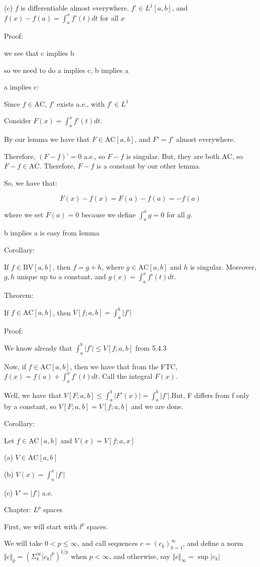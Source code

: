 \documentclass[10pt]{article}
\newcommand{\bv}{{\text{BV}}}
\newcommand{\ac}{\text{AC}}
\begin{document}
(c) $f$ is differentiable almost everywhere, $f’ \in L^1[a,b]$, and $f(x) - f(a)  = \int_a^x f’(t) dt$ for all $x$

Proof:

we see that c implies b

so we need to do a implies c, b implies a

a implies c:

Since $f \in \ac$, $f’$ exists a.e., with $f’ \in L^1$

Consider $F(x) = \int_a^x f’(t) dt$.

By our lemma we have that $F \in \ac[a,b]$, and $F’ = f’$ almost everywhere.

Therefore, $(F - f)’ = 0$ a.e., so $F - f$ is singular. But, they are both $\ac$, so $F - f \in \ac$. Therefore, $F - f$ is a constant by our other lemma.

So, we have that:

$$F(x) - f(x) = F(a) - f(a) = - f(a)$$

where we set $F(a) = 0$ because we define $\int_a^a g = 0$ for all $g$.

b implies a is easy from lemma

Corollary:

If $f \in \bv[a,b]$, then $f = g + h$, where $g \in \ac[a,b]$ and $h$ is singular. Moreover, $g,h$ unique up to a constant, and $g(x) = \int_a^x f’(t) dt$.

Theorem:

If $f \in \ac[a,b]$, then $V[f;a,b] = \int_a^b |f’|$

Proof:

We know already that $\int_a^b |f’| \leq V[f;a,b]$ from 5.4.3

Now, if $f \in \ac[a,b]$, then we have that from the FTC, $f(x) = f(a) + \int_a^x f’(t) dt$. Call the integral $F(x)$.

Well, we have that $V[F;a,b] \leq \int_a^b |F’(x)| = \int_a^b |f’|$.But, F differs from f only by a constant, so $V[F;a,b] = V[f;a,b]$ and we are done.

Corollary:

Let $f \in \ac[a,b]$ and $V(x) = V[f;a,x]$

(a) $V \in \ac[a,b]$

(b) $V(x) = \int_a^x |f’|$

(c) $V’ = |f’|$ a.e.

Chapter: $L^p$ spaces

First, we will start with $l^p$ spaces.

We will take $0 < p \leq \infty$, and call sequences $c = (c_k)_{k=1}^\infty$, and define a norm $\Vert c \Vert_p = \left( \Sigma_k^\infty |c_k|^p \right)^{1/p}$ when $p < \infty$, and otherwise, say $\Vert c \Vert_\infty = \sup | c_k |$
\end{document}
